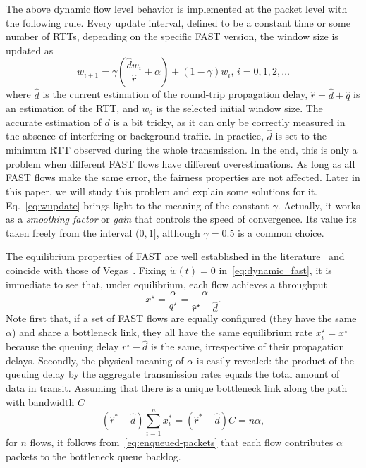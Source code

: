 \documentclass[english,times]{ettauth}
\begin{document}
The above dynamic flow level behavior is implemented at the packet level with
the following rule. Every update interval, defined to be a constant time or
some number of RTTs, depending on the specific FAST version, the window size
is updated as
\begin{equation}
  w_{i+1} = \gamma \left( \frac{\hat d w_i}{\hat r} + \alpha \right) +
  (1-\gamma)w_i,\,i=0,1,2,\ldots
  \label{eq:wupdate}
\end{equation}
where $\hat d$ is the current estimation of the round-trip propagation delay,
$\hat r = \hat d + \hat q$ is an estimation of the RTT, and $w_0$ is the
selected initial window size. The accurate estimation of $d$ is a bit tricky,
as it can only be correctly measured in the absence of interfering or
background traffic. In practice, $\hat d$ is set to the minimum RTT observed
during the whole transmission. In the end, this is only a problem when
different FAST flows have different overestimations. As long as all FAST flows
make the same error, the fairness properties are not affected. Later in this
paper, we will study this problem and explain some solutions for it.
Eq.~\eqref{eq:wupdate} brings light to the meaning of the constant $\gamma$.
Actually, it works as a \emph{smoothing factor} or \emph{gain} that controls
the speed of convergence. Its value its taken freely from the interval
$(0,1]$, although $\gamma = 0.5$ is a common choice.

The equilibrium properties of FAST are well established in the
literature~\cite{Wei06,Jin03} and coincide with those of
Vegas~\cite{Low02,Samios03}. Fixing $\dot w(t) = 0$
in~\eqref{eq:dynamic_fast}, it is immediate to see that, under equilibrium,
each flow achieves a throughput
\begin{equation}
  \label{eq:fast-tput-equilibrium}
  x^\star = \frac{\alpha}{q^\star} = \frac{\alpha}{\hat r^\star - \hat d}.
\end{equation}
Note first that, if a set of FAST flows are equally configured (they have the
same $\alpha$) and share a bottleneck link, they all have the same
equilibrium rate $x^\star_i = x^\star$ because the queuing delay $r^\star -
\hat d$ is the same, irrespective of their propagation delays. Secondly, the
physical meaning of $\alpha$ is easily revealed: the product of the queuing
delay by the aggregate transmission rates equals the total amount of data in
transit. Assuming that there is a unique bottleneck link along the path with
bandwidth $C$
\begin{equation}
  \label{eq:enqueued-packets}
  (\hat r^* - \hat d)\sum_{i=1}^n x_i^* = (\hat r^* - \hat d)C = n\alpha,
\end{equation}
for $n$ flows, it follows from~\eqref{eq:enqueued-packets} that each flow
contributes $\alpha$ packets to the bottleneck queue backlog.
\end{document}
